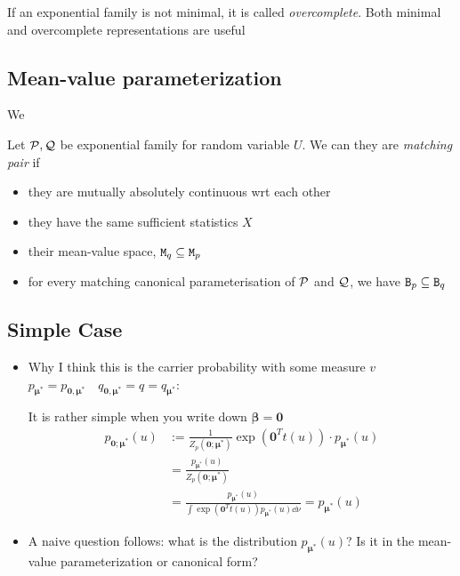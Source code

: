 If an exponential family is not minimal, it is
called \emph{overcomplete}. Both minimal and overcomplete representations are useful



\subsection{Mean-value parameterization}

We 


\begin{define}
	Let $\mathcal{P}, \mathcal{Q}$ be exponential family for random variable $U$.
	We can they are \emph{matching pair} if 
	\begin{itemize}
		\item they are mutually absolutely continuous wrt each other
		\item they have the same sufficient statistics $X$
		\item their mean-value space, $\mathtt{M}_q\subseteq\mathtt{M}_p$
		\item for every matching canonical parameterisation of $\mathcal{P}$ and $\mathcal{Q}$, 
				we have $\mathtt{B}_p\subseteq\mathtt{B}_q$
	\end{itemize}
\end{define}



\subsection{Simple Case}
\begin{itemize}
	\item Why I think this is the carrier probability with some measure $v$ $p_{\bm{\mu}^*} = p_{\bm{0}, \bm{\mu}^*} \quad q_{\bm{0},\bm{\mu}^*} = q = q_{\bm{\mu}^*}$:

	      It is rather simple when you write down $\bm{\beta}=\bm{0}$
	      \begin{align*}
		      p_{\bm{0};\bm{\mu}^*}(u) & :=
		      \frac{1}{Z_p(\bm{0};\bm{\mu}^*)}\exp(\bm{0}^T t(u))\cdot p_{\bm{\mu}^*}(u)                               \\
		                               & = \frac{p_{\bm{\mu}^*}(u)}{Z_p(\bm{0};\bm{\mu}^*)}                            \\
		                               & = \frac{p_{\bm{\mu}^*}(u)}{\int\exp(\bm{0}^T t(u)) p_{\bm{\mu}^*}(u)\dd{\nu}}
		      = p_{\bm{\mu}^*}(u)
	      \end{align*}

	\item A naive question follows: what is the distribution $p_{\bm{\mu}^*}(u)$?
	      Is it in the mean-value parameterization or canonical form?
\end{itemize}

